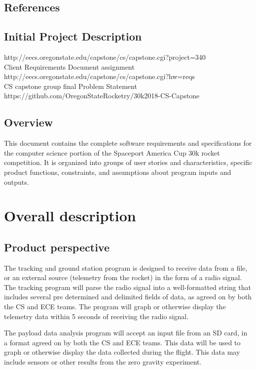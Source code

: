 \documentclass[onecolumn, draftclsnofoot, 10pt, compsoc]{IEEEtran}
\begin{document}
\subsection{References}
\subsection*{Initial Project Description}
http://eecs.oregonstate.edu/capstone/cs/capstone.cgi?project=340\\
Client Requirements Document assignment\\
http://eecs.oregonstate.edu/capstone/cs/capstone.cgi?hw=reqs\\
CS capstone group final Problem Statement\\
https://github.com/OregonStateRocketry/30k2018-CS-Capstone

\subsection{Overview}
This document contains the complete software requirements and specifications for the computer science portion of the Spaceport America Cup 30k rocket competition.  It is organized into groups of user stories and characteristics, specific product functions, constraints, and assumptions about program inputs and outputs.

\section{Overall description}
\subsection{Product perspective}
The tracking and ground station program is designed to receive data from a file, or an external source (telemetry from the rocket) in the form of a radio signal. The tracking program will parse the radio signal into a well-formatted string that includes several pre determined and delimited fields of data, as agreed on by both the CS and ECE teams. The program will graph or otherwise display the telemetry data within 5 seconds of receiving the radio signal.

The payload data analysis program will accept an input file from an SD card, in a format agreed on by both the CS and ECE teams.  This data will be used to graph or otherwise display the data collected during the flight. This data may include sensors or other results from the zero gravity experiment.
\end{document}
